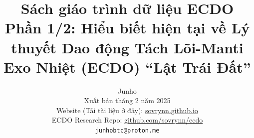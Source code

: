 \documentclass[10pt,twocolumn,letterpaper]{article}
\begin{document}
\title{Sách giáo trình dữ liệu ECDO Phần 1/2: Hiểu biết hiện tại về Lý thuyết Dao động Tách Lõi-Manti Exo Nhiệt (ECDO) “Lật Trái Đất”}

\author{Junho\\
Xuất bản tháng 2 năm 2025\\
Website (Tải tài liệu ở đây): \href{https://sovrynn.github.io}{sovrynn.github.io}\\
ECDO Research Repo: \href{https://github.com/sovrynn/ecdo}{github.com/sovrynn/ecdo}\\
{\tt\small junhobtc@proton.me}
}

\maketitle
\end{document}
